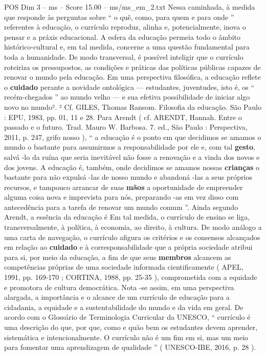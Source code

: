 \begin{textsample}{POS Dim 3 – ms – Score 15.00 – ms/ms\_em\_2.txt}
Nessa caminhada, à medida que responde às perguntas sobre “ o quê, como, para quem e para onde ” referentes à educação, o currículo reproduz, alinha e, potencialmente, inova o pensar e a práxis educacional.
A esfera da educação permeia todo o âmbito histórico-cultural e, em tal medida, concerne a uma questão fundamental para toda a humanidade.
De modo transversal, é possível inteligir que o currículo roteiriza os pressupostos, as condições e práticas das políticas públicas capazes de renovar o mundo pela educação.
Em uma perspectiva filosófica, a educação reflete o \textbf{cuidado} perante a novidade ontológica — estudantes, juventudes, isto é, os “ recém-chegados ” ao mundo velho — e sua efetiva possibilidade de iniciar algo novo no mundo². ² Cf.
GILES, Thomas Ransom.
Filosofia da educação.
São Paulo : EPU, 1983, pp. 01, 11 e 28.
Para Arendt ( cf.
ARENDT, Hannah.
Entre o passado e o futuro.
Trad.
Mauro W.
Barbosa. 7. ed., São Paulo : Perspectiva, 2011, p. 247, grifo nosso ), “ a educação é o ponto em que decidimos se amamos o mundo o bastante para assumirmos a responsabilidade por ele e, com tal \textbf{gesto}, salvá -lo da ruína que seria inevitável não fosse a renovação e a vinda dos novos e dos jovens.
A educação é, também, onde decidimos se amamos nossas \textbf{crianças} o bastante para não expulsá -las de nosso mundo e abandoná -las a seus próprios recursos, e tampouco arrancar de suas \textbf{mãos} a oportunidade de empreender alguma coisa nova e imprevista para nós, preparando -as em vez disso com antecedência para a tarefa de renovar um mundo comum ”.
Ainda segundo Arendt, a essência da educação é Em tal medida, o currículo de ensino se liga, transversalmente, à política, à economia, ao direito, à cultura.
De modo análogo a uma carta de navegação, o currículo afigura os critérios e os consensos alcançados em relação ao \textbf{cuidado} e à corresponsabilidade que a própria sociedade atribui para si, por meio da educação, a fim de que seus \textbf{membros} alcancem as competências próprias de uma sociedade informada cientificamente ( APEL, 1991, pp. 169-170 ; CORTINA, 1988, pp. 25-35 ), comprometida com a equidade e promotora de cultura democrática.
Nota -se assim, em uma perspectiva alargada, a importância e o alcance de um currículo de educação para a cidadania, a equidade e a sustentabilidade do mundo e da vida em geral.
De acordo com o Glossário de Terminologia Curricular da UNESCO, “ currículo é uma descrição do que, por que, como e quão bem os estudantes devem aprender, sistemática e intencionalmente.
O currículo não é um fim em si, mas um meio para fomentar uma aprendizagem de qualidade ” ( UNESCO-IBE, 2016, p. 28 ).

\end{textsample}
